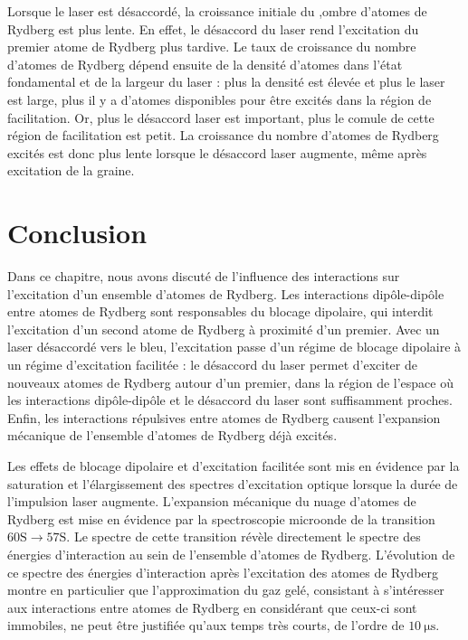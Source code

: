 Lorsque le laser est désaccordé, la croissance initiale du ,ombre d'atomes de Rydberg est plus lente.
En effet, le désaccord du laser rend l'excitation du premier atome de Rydberg plus tardive.
Le taux de croissance du nombre d'atomes de Rydberg dépend ensuite de la densité d'atomes dans l'état fondamental et de la largeur du laser : plus la densité est élevée et plus le laser est large, plus il y a d'atomes disponibles pour être excités dans la région de facilitation.
Or, plus le désaccord laser est important, plus le comule de cette région de facilitation est petit.
La croissance du nombre d'atomes de Rydberg excités est donc plus lente lorsque le désaccord laser augmente, même après excitation de la graine.

\clearpage

\section*{Conclusion}
\noindent Dans ce chapitre, nous avons discuté de l'influence des interactions sur l'excitation d'un ensemble d'atomes de Rydberg.
Les interactions dipôle-dipôle entre atomes de Rydberg sont responsables du blocage dipolaire, qui interdit l'excitation d'un second atome de Rydberg à proximité d'un premier.
Avec un laser désaccordé vers le bleu, l'excitation passe d'un régime de blocage dipolaire à un régime d'excitation facilitée : le désaccord du laser permet d'exciter de nouveaux atomes de Rydberg autour d'un premier, dans la région de l'espace où les interactions dipôle-dipôle et le désaccord du laser sont suffisamment proches.
Enfin, les interactions répulsives entre atomes de Rydberg causent l'expansion mécanique de l'ensemble d'atomes de Rydberg déjà excités.

Les effets de blocage dipolaire et d'excitation facilitée sont mis en évidence par la saturation et l'élargissement des spectres d'excitation optique lorsque la durée de l'impulsion laser augmente.
L'expansion mécanique du nuage d'atomes de Rydberg est mise en évidence par la spectroscopie microonde de la transition $\mathrm{60S}\rightarrow\mathrm{57S}$.
Le spectre de cette transition révèle directement le spectre des énergies d'interaction au sein de l'ensemble d'atomes de Rydberg.
L'évolution de ce spectre des énergies d'interaction après l'excitation des atomes de Rydberg montre en particulier que l'approximation du gaz gelé, consistant à s'intéresser aux interactions entre atomes de Rydberg en considérant que ceux-ci sont immobiles, ne peut être justifiée qu'aux temps très courts, de l'ordre de $\SI{10}{\us}$.

